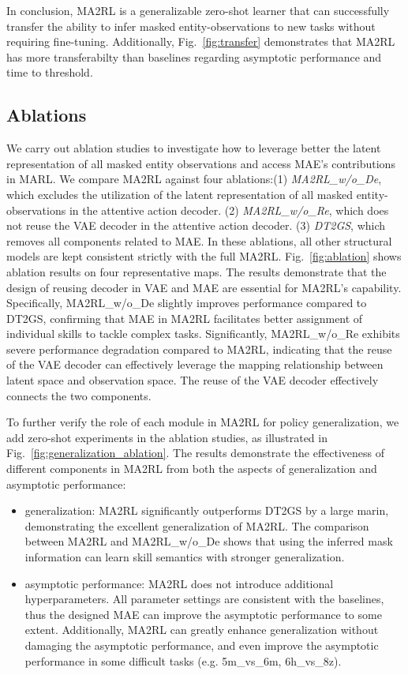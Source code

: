 In conclusion, MA2RL is a generalizable zero-shot learner that can successfully transfer the ability to infer masked entity-observations to new tasks without requiring fine-tuning. Additionally, Fig.~\ref{fig:transfer} demonstrates that MA2RL has more transferabilty than baselines regarding asymptotic  performance and time to threshold.

\subsection{Ablations}
\label{subsec:ablation}
We carry out ablation studies to investigate how to leverage better the latent representation of all masked entity observations and access MAE's contributions in MARL. We compare MA2RL against four ablations:(1) \textit{MA2RL\_w/o\_De}, which excludes the utilization of the latent representation of all masked entity-observations in the attentive action decoder. (2) \textit{MA2RL\_w/o\_Re}, which does not reuse the VAE decoder in the attentive action decoder. (3) \textit{DT2GS}, which removes all components related to MAE. In these ablations, all other structural models are kept consistent strictly with the full MA2RL. Fig.~\ref{fig:ablation} shows ablation results on four representative maps. The results demonstrate that the design of reusing decoder in VAE and MAE are essential for MA2RL's capability. Specifically,  MA2RL\_w/o\_De slightly improves performance compared to DT2GS, confirming that MAE in MA2RL facilitates better assignment of individual skills to tackle complex tasks. Significantly, MA2RL\_w/o\_Re exhibits severe performance degradation compared to MA2RL, indicating that the reuse of the VAE decoder can effectively leverage the mapping relationship between latent space and observation space. The reuse of the VAE decoder effectively connects the two components.

To further verify the role of each module in MA2RL for policy generalization, we add zero-shot experiments in the ablation studies, as illustrated in Fig.~\ref{fig:generalization_ablation}. The results demonstrate the effectiveness of different components in MA2RL from both the aspects of generalization and asymptotic performance:
\begin{itemize}
    \item generalization: MA2RL significantly outperforms DT2GS by a large marin, demonstrating the excellent generalization of MA2RL. The comparison between MA2RL and MA2RL\_w/o\_De shows that using the inferred mask information can learn skill semantics with stronger generalization.
    \item asymptotic performance: MA2RL does not introduce additional hyperparameters. All parameter settings are consistent with the baselines, thus the designed MAE can improve the asymptotic performance to some extent. Additionally, MA2RL can greatly enhance generalization without damaging the asymptotic performance, and even improve the asymptotic performance in some difficult tasks (e.g. 5m\_vs\_6m, 6h\_vs\_8z).
\end{itemize}

